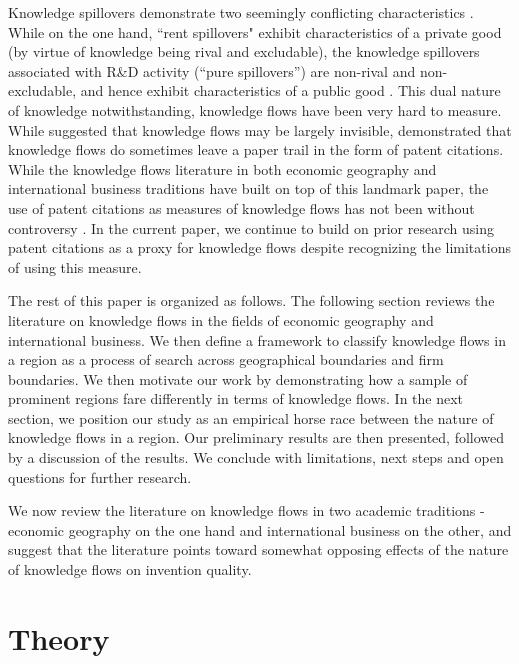 \documentclass[12pt,letterpaper]{article}
\begin{document}
Knowledge spillovers demonstrate two seemingly conflicting characteristics \citep{Griliches1979}. While on the one hand, ``rent spillovers" exhibit characteristics of a private good (by virtue of knowledge being rival and excludable), the knowledge spillovers associated with R\&D activity (``pure spillovers'') are non-rival and non-excludable, and hence exhibit characteristics of a public good \citep{Arrow1962}.  This dual nature of knowledge notwithstanding, knowledge flows have been very hard to measure.    While \cite{Krugman1991a} suggested that knowledge flows may be largely invisible, \cite*{Jaffe1993} demonstrated that  knowledge flows do sometimes leave a paper trail in the form of patent citations. While the knowledge flows literature in both economic geography and international business traditions have built on top of this landmark paper, the use of patent citations as measures of knowledge flows has not been without controversy \citep*{Arora2017a, Alcacer2006a}. In the current paper, we continue to build on prior research using patent citations as a proxy for knowledge flows despite recognizing the limitations of using this measure. \par

The rest of this paper is organized as follows. The following section reviews the literature on knowledge flows in the fields of economic geography and international business. We then define a framework to classify knowledge flows in a region as a process of search across geographical boundaries and firm boundaries. We then motivate our work by demonstrating how a sample of prominent regions fare differently in terms of knowledge flows. In the next section, we position our study as an empirical horse race between the nature of knowledge flows in a region. Our preliminary results are then presented, followed by a discussion of the results. We conclude with limitations, next steps and open questions for further research. \par

We now review the literature on knowledge flows in two academic traditions - economic geography on the one hand and international business on the other, and suggest that the literature points toward somewhat opposing effects of the nature of knowledge flows on invention quality. 

\section*{Theory}
\end{document}
